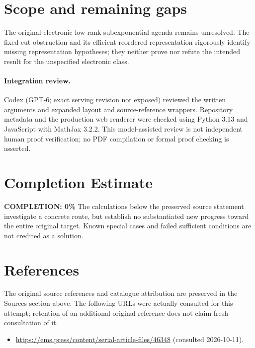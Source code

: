 \documentclass[11pt]{article}
\begin{document}
\section{Scope and remaining gaps}
The original electronic low-rank subexponential agenda remains unresolved. The fixed-cut obstruction and its efficient reordered representation rigorously identify missing representation hypotheses; they neither prove nor refute the intended result for the unspecified electronic class.
\paragraph{Integration review.} Codex (GPT-6; exact serving revision not exposed) reviewed the written arguments and expanded layout and source-reference wrappers. Repository metadata and the production web renderer were checked using Python 3.13 and JavaScript with MathJax 3.2.2. This model-assisted review is not independent human proof verification; no PDF compilation or formal proof checking is asserted.

\section{Completion Estimate}
\noindent\textbf{COMPLETION: 0\%}
The calculations below the preserved source statement investigate a concrete route,
but establish no substantiated new progress toward the entire original target.
Known special cases and failed sufficient conditions are not credited as a solution.
\section{References}
The original source references and catalogue attribution are preserved in the
Sources section above. The following URLs were actually consulted for this attempt;
retention of an additional original reference does not claim fresh consultation of it.
\begin{itemize}
\item \url{https://ems.press/content/serial-article-files/46348} (consulted 2026-10-11). 
\end{itemize}
\end{document}
